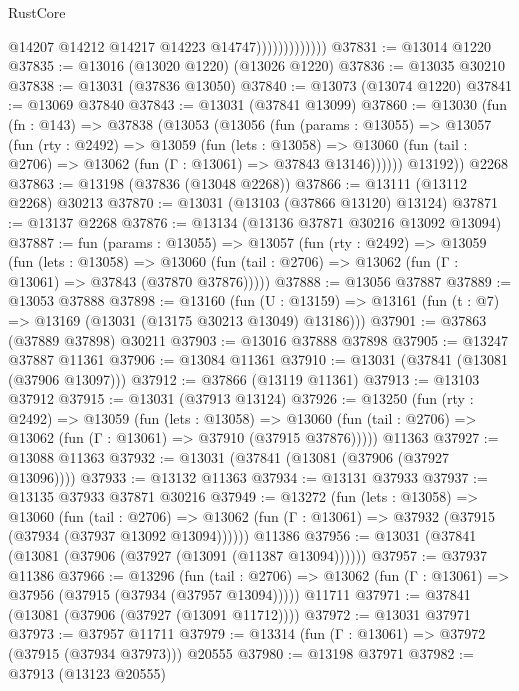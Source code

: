 \begin{lexlean}{RustCore}
\begin{coremodule}
                              @14207
                              @14212
                              @14217
                              @14223
                              @14747)))))))))))))
@37831 := @13014 @1220
@37835 := @13016 (@13020 @1220) (@13026 @1220)
@37836 := @13035 @30210
@37838 := @13031 (@37836 @13050)
@37840 := @13073 (@13074 @1220)
@37841 := @13069 @37840
@37843 := @13031 (@37841 @13099)
@37860 := @13030
    (fun (fn : @143) =>
    @37838
      (@13053
        (@13056
          (fun (params : @13055) =>
          @13057
            (fun (rty : @2492) =>
            @13059
              (fun (lets : @13058) =>
              @13060 (fun (tail : @2706) => @13062 (fun (Γ : @13061) => @37843 @13146))))))
        @13192))
    @2268
@37863 := @13198 (@37836 (@13048 @2268))
@37866 := @13111 (@13112 @2268) @30213
@37870 := @13031 (@13103 (@37866 @13120) @13124)
@37871 := @13137 @2268
@37876 := @13134 (@13136 @37871 @30216 @13092 @13094)
@37887 := fun (params : @13055) =>
  @13057
    (fun (rty : @2492) =>
    @13059
      (fun (lets : @13058) =>
      @13060 (fun (tail : @2706) => @13062 (fun (Γ : @13061) => @37843 (@37870 @37876)))))
@37888 := @13056 @37887
@37889 := @13053 @37888
@37898 := @13160
    (fun (U : @13159) => @13161 (fun (t : @7) => @13169 (@13031 (@13175 @30213 @13049) @13186)))
@37901 := @37863 (@37889 @37898) @30211
@37903 := @13016 @37888 @37898
@37905 := @13247 @37887 @11361
@37906 := @13084 @11361
@37910 := @13031 (@37841 (@13081 (@37906 @13097)))
@37912 := @37866 (@13119 @11361)
@37913 := @13103 @37912
@37915 := @13031 (@37913 @13124)
@37926 := @13250
    (fun (rty : @2492) =>
    @13059
      (fun (lets : @13058) =>
      @13060 (fun (tail : @2706) => @13062 (fun (Γ : @13061) => @37910 (@37915 @37876)))))
    @11363
@37927 := @13088 @11363
@37932 := @13031 (@37841 (@13081 (@37906 (@37927 @13096))))
@37933 := @13132 @11363
@37934 := @13131 @37933
@37937 := @13135 @37933 @37871 @30216
@37949 := @13272
    (fun (lets : @13058) =>
    @13060
      (fun (tail : @2706) =>
      @13062 (fun (Γ : @13061) => @37932 (@37915 (@37934 (@37937 @13092 @13094))))))
    @11386
@37956 := @13031 (@37841 (@13081 (@37906 (@37927 (@13091 (@11387 @13094))))))
@37957 := @37937 @11386
@37966 := @13296
    (fun (tail : @2706) => @13062 (fun (Γ : @13061) => @37956 (@37915 (@37934 (@37957 @13094)))))
    @11711
@37971 := @37841 (@13081 (@37906 (@37927 (@13091 @11712))))
@37972 := @13031 @37971
@37973 := @37957 @11711
@37979 := @13314 (fun (Γ : @13061) => @37972 (@37915 (@37934 @37973))) @20555
@37980 := @13198 @37971
@37982 := @37913 (@13123 @20555)

\end{coremodule}
\end{lexlean}
